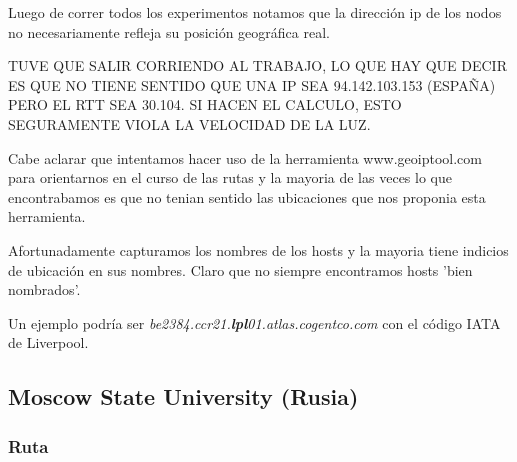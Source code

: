 Luego de correr todos los experimentos notamos que la direcci\'on ip de los nodos
no necesariamente refleja su posici\'on geogr\'afica real.

TUVE QUE SALIR CORRIENDO AL TRABAJO, LO QUE HAY QUE DECIR ES QUE NO TIENE SENTIDO
QUE UNA IP SEA 94.142.103.153 (ESPAÑA) PERO EL RTT SEA 30.104. SI HACEN EL 
CALCULO, ESTO SEGURAMENTE VIOLA LA VELOCIDAD DE LA LUZ.

Cabe aclarar que intentamos hacer uso de la herramienta www.geoiptool.com para orientarnos en 
el curso de las rutas y la mayoria de las veces lo que encontrabamos es que no tenian sentido las 
ubicaciones que nos proponia esta herramienta.

Afortunadamente capturamos los nombres de los hosts y la mayoria tiene indicios de ubicaci\'on en sus
nombres. Claro que no siempre encontramos hosts 'bien nombrados'.

Un ejemplo podr\'ia ser \emph{be2384.ccr21.\textbf{lpl}01.atlas.cogentco.com} con el c\'odigo IATA de 
Liverpool.

\subsection{Moscow State University (Rusia)}

\subsubsection{Ruta}

~

